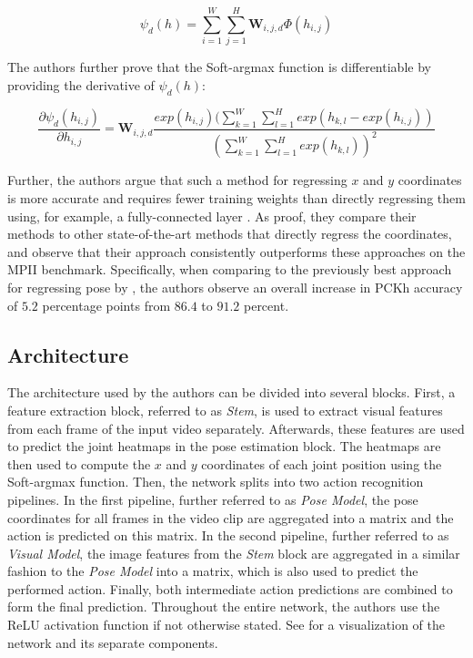 \begin{equation}
    \label{eq:softargmax_conv}
    \psi_d(h) = \sum_{i=1}^W \sum_{j=1}^H \bm{W}_{i,j,d} \Phi(h_{i,j})
\end{equation}

The authors further prove that the Soft-argmax function is differentiable by providing the derivative of $\psi_d(h)$:

\begin{equation}
    \frac{\partial \psi_d(h_{i,j})}{\partial h_{i,j}} = \bm{W}_{i,j,d} \frac{ exp(h_{i,j}) (\sum_{k=1}^W \sum_{l=1}^H exp(h_{k,l} - exp(h_{i,j}) ) } { ( \sum_{k=1}^W \sum_{l=1}^H exp(h_{k,l}) )^2 }
\end{equation}

Further, the authors argue that such a method for regressing $x$ and $y$ coordinates is more accurate and requires fewer training weights than directly regressing them using, for example, a fully-connected layer \cite{luvizon_human_2017}.
As proof, they compare their methods to other state-of-the-art methods that directly regress the coordinates, and observe that their approach consistently outperforms these approaches on the MPII benchmark.
Specifically, when comparing to the previously best approach for regressing pose by \cite{sun_compositional_2017}, the authors observe an overall increase in PCKh accuracy of $5.2$ percentage points from $86.4$ to $91.2$ percent.

\subsection{Architecture}
\label{sec:deephar_architecture}

The architecture used by the authors can be divided into several blocks.
First, a feature extraction block, referred to as \textit{Stem}, is used to extract visual features from each frame of the input video separately.
Afterwards, these features are used to predict the joint heatmaps in the pose estimation block.
The heatmaps are then used to compute the $x$ and $y$ coordinates of each joint position using the Soft-argmax function.
Then, the network splits into two action recognition pipelines.
In the first pipeline, further referred to as \textit{Pose Model}, the pose coordinates for all frames in the video clip are aggregated into a matrix and the action is predicted on this matrix.
In the second pipeline, further referred to as \textit{Visual Model}, the image features from the \textit{Stem} block are aggregated in a similar fashion to the \textit{Pose Model} into a matrix, which is also used to predict the performed action.
Finally, both intermediate action predictions are combined to form the final prediction.
Throughout the entire network, the authors use the ReLU activation function if not otherwise stated.
See  for a visualization of the network and its separate components.

